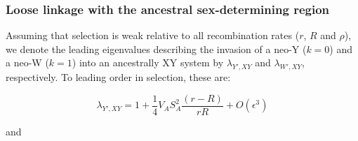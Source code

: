 \documentclass[12pt]{article}
\begin{document}
\subsubsection*{Loose linkage with the ancestral sex-determining region}



Assuming that selection is weak relative to all recombination rates ($r$, $R$ and $\rho$), we denote the leading eigenvalues describing the invasion of a neo-Y ($k=0$) and a neo-W ($k=1$) into an ancestrally XY system by $\lambda_{Y',XY}$ and $\lambda_{W',XY}$, respectively. To leading order in selection, these are:

\begin{equation}
\lambda_{Y',XY} =1+ \frac{1}{4}V_{A}S_{A}^2\frac{ \left( r-R \right) }{r R}+O\left(\epsilon^3 \right) 
\label{eq:lambda_neoY}
\end{equation}

\noindent 
and 
\end{document}
